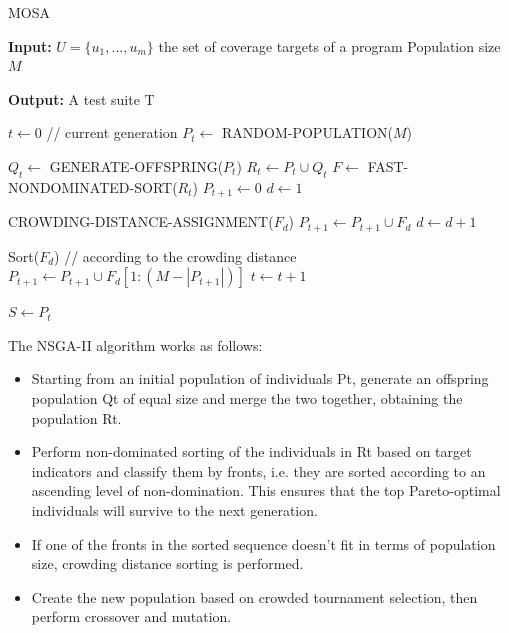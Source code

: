 \begin{algorithm}
    \caption{MOSA}
    \hspace*{\algorithmicindent} \textbf{Input:} 
    $ U = \{u_1,...,u_m\} $ the set of coverage targets of a program
    Population size $ M $

    \hspace*{\algorithmicindent} \textbf{Output:}
    A test suite T
    
    \begin{algorithmic}[1]
        \Begin
            \State $ t \leftarrow 0 $ // current generation
            \State $ P_t \leftarrow $ RANDOM-POPULATION($ M $) 

                \State $ Q_t \leftarrow $  GENERATE-OFFSPRING($ P_t $)
                \State $ R_t \leftarrow P_t \cup Q_t $
                \State $ F \leftarrow $  FAST-NONDOMINATED-SORT($ R_t $)
                \State $ P_{t + 1} \leftarrow 0 $
                \State $ d \leftarrow 1 $

                    CROWDING-DISTANCE-ASSIGNMENT($ F_d $)
                    \State $ P_{t + 1} \leftarrow P_{t + 1} \cup F_d $
                    \State $ d \leftarrow d + 1 $
                \EndWhile

                Sort($ F_d $) // according to the crowding distance
                \State $ P_{t + 1} \leftarrow P_{t + 1} \cup F_d[1: (M - |P_{t + 1}|)] $
                \State $ t \leftarrow t + 1 $
            \EndWhile

            \State $ S \leftarrow P_t $
        \End
    \end{algorithmic}
\end{algorithm}

The NSGA-II algorithm works as follows:
\begin{itemize}
    \item Starting from an initial population of individuals Pt, generate an offspring population Qt of equal size and merge the two together, obtaining the population Rt.
    \item Perform non-dominated sorting of the individuals in Rt based on target indicators and classify them by fronts, i.e. they are sorted according to an ascending level of non-domination.  This ensures that the top Pareto-optimal individuals will survive to the next generation.
    \item If one of the fronts in the sorted sequence doesn't fit in terms of population size, crowding distance sorting is performed.
    \item Create the new population based on crowded tournament selection, then perform crossover and mutation. 
\end{itemize}


